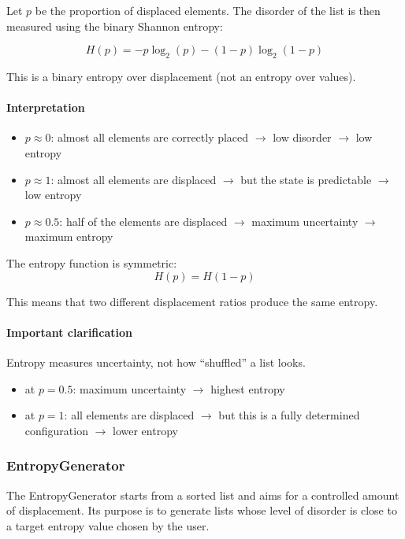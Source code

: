 \documentclass{article}
\begin{document}
Let $p$ be the proportion of displaced elements. The disorder of the list is then measured using the binary Shannon entropy:

\[
H(p) = -p \log_2(p) - (1-p)\log_2(1-p)
\]

This is a binary entropy over displacement (not an entropy over values).

\paragraph{Interpretation}
\begin{itemize}
    \item $p \approx 0$: almost all elements are correctly placed $\rightarrow$ low disorder $\rightarrow$ low entropy
    \item $p \approx 1$: almost all elements are displaced $\rightarrow$ but the state is predictable $\rightarrow$ low entropy
    \item $p \approx 0.5$: half of the elements are displaced $\rightarrow$ maximum uncertainty $\rightarrow$ maximum entropy
\end{itemize}

The entropy function is symmetric:
\[
H(p) = H(1-p)
\]

This means that two different displacement ratios produce the same entropy.

\paragraph{Important clarification}

Entropy measures uncertainty, not how “shuffled” a list looks.
\begin{itemize}
    \item at $p = 0.5$: maximum uncertainty $\rightarrow$ highest entropy
    \item at $p = 1$: all elements are displaced $\rightarrow$ but this is a fully determined configuration $\rightarrow$ lower entropy
\end{itemize}

\subsubsection{EntropyGenerator}

The EntropyGenerator starts from a sorted list and aims for a controlled amount of displacement. Its purpose is to generate lists whose level of disorder is close to a target entropy value chosen by the user.
\end{document}
